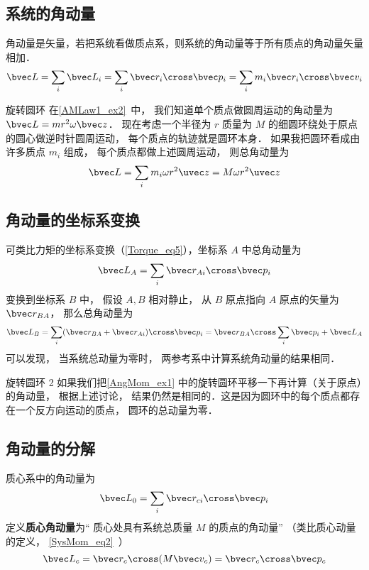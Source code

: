 

\subsection{系统的角动量}
角动量是矢量，若把系统看做质点系，则系统的角动量等于所有质点的角动量矢量相加．
\begin{equation}\label{AngMom_eq1}
\bvec L = \sum_i \bvec L_i = \sum_i \bvec r_i \cross\bvec p_i = \sum_i m_i \bvec r_i \cross\bvec v_i
\end{equation}
\begin{example}{旋转圆环}\label{AngMom_ex1}
在\autoref{AMLaw1_ex2}~中， 我们知道单个质点做圆周运动的角动量为 $\bvec L = m r^2 \omega \bvec z$． 现在考虑一个半径为 $r$ 质量为 $M$ 的细圆环绕处于原点的圆心做逆时针圆周运动， 每个质点的轨迹就是圆环本身． 如果我把圆环看成由许多质点 $m_i$ 组成， 每个质点都做上述圆周运动， 则总角动量为
\begin{equation}
\bvec L = \sum_i m_i \omega r^2 \uvec z = M \omega r^2 \uvec z
\end{equation}
\end{example}

\subsection{角动量的坐标系变换}
可类比力矩的坐标系变换（\autoref{Torque_eq5}），坐标系 $A$ 中总角动量为
\begin{equation}
\bvec L_A = \sum_i \bvec r_{Ai} \cross \bvec p_i 
\end{equation}
变换到坐标系 $B$ 中， 假设 $A, B$ 相对静止， 从 $B$ 原点指向 $A$ 原点的矢量为 $\bvec r_{BA}$， 那么总角动量为
\begin{equation}\label{AngMom_eq4}
\bvec L_B = \sum_i (\bvec r_{BA} + \bvec r_{Ai})\cross \bvec p_i = \bvec r_{BA}\cross \sum_i \bvec p_i + \bvec L_A
\end{equation}
可以发现， 当系统总动量为零时， 两参考系中计算系统角动量的结果相同．

\begin{example}{旋转圆环 2}
如果我们把\autoref{AngMom_ex1} 中的旋转圆环平移一下再计算（关于原点）的角动量， 根据上述讨论， 结果仍然是相同的．这是因为圆环中的每个质点都存在一个反方向运动的质点， 圆环的总动量为零．
\end{example}

\subsection{角动量的分解}
质心系中的角动量为
\begin{equation}\label{AngMom_eq5}
\bvec L_0 = \sum_i \bvec r_{ci} \cross \bvec p_i
\end{equation}
定义\textbf{质心角动量}为“ 质心处具有系统总质量 $M$ 的质点的角动量” （类比质心动量的定义， \autoref{SysMom_eq2}~）
\begin{equation}\label{AngMom_eq6}
\bvec L_c  = \bvec r_c \cross (M \bvec v_c) = \bvec r_c \cross \bvec p_c
\end{equation}

